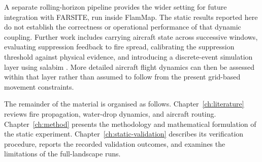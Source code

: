 A separate rolling-horizon pipeline provides the wider setting for future integration with FARSITE, run inside FlamMap. The static results reported here do not establish the correctness or operational performance of that dynamic coupling. Further work includes carrying aircraft state across successive windows, evaluating suppression feedback to fire spread, calibrating the suppression threshold against physical evidence, and introducing a discrete-event simulation layer using salabim \cite{vanderham2018salabim}. More detailed aircraft flight dynamics can then be assessed within that layer rather than assumed to follow from the present grid-based movement constraints.

The remainder of the material is organised as follows. Chapter~\ref{ch:literature} reviews fire propagation, water-drop dynamics, and aircraft routing. Chapter~\ref{ch:method} presents the methodology and mathematical formulation of the static experiment. Chapter~\ref{ch:static-validation} describes its verification procedure, reports the recorded validation outcomes, and examines the limitations of the full-landscape runs.
